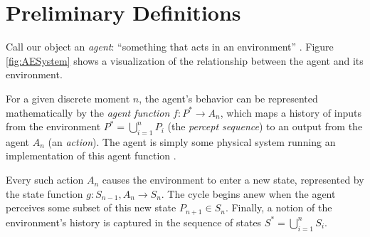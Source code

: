 \documentclass[12pt,letterpaper]{article}
\begin{document}






\section*{Preliminary Definitions}

Call our object an \emph{agent}: ``something that acts in an environment'' \cite[p.~4]{Poole:2010}. Figure \ref{fig:AESystem} shows a visualization of the relationship between the agent and its environment.

\begin{SCfigure}[][h]
	\centering
	\caption{A very simplified view of an isolated agent-environment system. The agent impacts the environment through its actions, and is influenced by its perception of the environment.}
	\label{fig:AESystem}
\end{SCfigure}

For a given discrete moment $n$, the agent's behavior can be represented mathematically by the \emph{agent function} $f : P^\ast \to A_n$, which maps a history of inputs from the environment $P^\ast = \bigcup\limits_{i=1}^n P_i$ (the \emph{percept sequence}) to an output from the agent $A_n$ (an \emph{action}). The agent is simply some physical system running an implementation of this agent function \cite{Russell:2010}.

Every such action $A_n$ causes the environment to enter a new state, represented by the state function $g : S_{n-1}, A_n \to S_n$. The cycle begins anew when the agent perceives some subset of this new state $P_{n+1} \in S_n$. Finally, a notion of the environment's history is captured in the sequence of states $S^\ast = \bigcup\limits_{i=1}^n S_i$.
\end{document}
